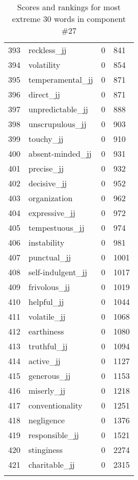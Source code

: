 \begin{longtable}[!htbp]{| rlr@{.}l |}
    393 & reckless\_jj & 0 & 841 \\
    394 & volatility & 0 & 854 \\
    395 & temperamental\_jj & 0 & 871 \\
    396 & direct\_jj & 0 & 871 \\
    397 & unpredictable\_jj & 0 & 888 \\
    398 & unscrupulous\_jj & 0 & 903 \\
    399 & touchy\_jj & 0 & 910 \\
    400 & absent-minded\_jj & 0 & 931 \\
    401 & precise\_jj & 0 & 932 \\
    402 & decisive\_jj & 0 & 952 \\
    403 & organization & 0 & 962 \\
    404 & expressive\_jj & 0 & 972 \\
    405 & tempestuous\_jj & 0 & 974 \\
    406 & instability & 0 & 981 \\
    407 & punctual\_jj & 0 & 1001 \\
    408 & self-indulgent\_jj & 0 & 1017 \\
    409 & frivolous\_jj & 0 & 1019 \\
    410 & helpful\_jj & 0 & 1044 \\
    411 & volatile\_jj & 0 & 1068 \\
    412 & earthiness & 0 & 1080 \\
    413 & truthful\_jj & 0 & 1094 \\
    414 & active\_jj & 0 & 1127 \\
    415 & generous\_jj & 0 & 1153 \\
    416 & miserly\_jj & 0 & 1218 \\
    417 & conventionality & 0 & 1251 \\
    418 & negligence & 0 & 1376 \\
    419 & responsible\_jj & 0 & 1521 \\
    420 & stinginess & 0 & 2274 \\
    421 & charitable\_jj & 0 & 2315 \\
    \hline
    \caption{Scores and rankings for most extreme 30 words in component \#27} \\
\end{longtable}
